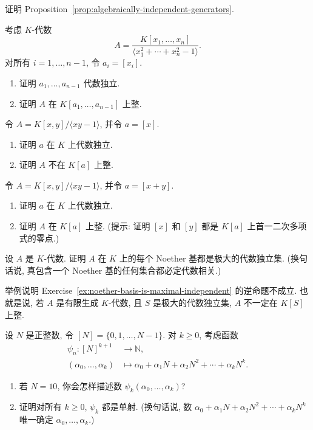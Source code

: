 \BookExerciseHeading
\begin{BookExercises}
  \item\label{ex:prove-independent-generators-proposition} 证明 Proposition~\ref{prop:algebraically-independent-generators}.
  \item\label{ex:noether-basis-for-unit-sphere} 考虑 $K$-代数
  \[
    A=\frac{K[x_{1},\ldots,x_{n}]}{\langle x_{1}^{2}+\cdots+x_{n}^{2}-1\rangle}.
  \]
  对所有 $i=1,\ldots,n-1$, 令 $a_{i}=[x_{i}]$.
  \begin{enumerate}
    \item 证明 $a_{1},\ldots,a_{n-1}$ 代数独立.
    \item 证明 $A$ 在 $K[a_{1},\ldots,a_{n-1}]$ 上整.
  \end{enumerate}
  \item\label{ex:hyperbola-not-integral-over-x} 令 $A=K[x,y]/\langle xy-1\rangle$, 并令 $a=[x]$.
  \begin{enumerate}
    \item 证明 $a$ 在 $K$ 上代数独立.
    \item 证明 $A$ 不在 $K[a]$ 上整.
  \end{enumerate}
  \item\label{ex:hyperbola-integral-over-sum} 令 $A=K[x,y]/\langle xy-1\rangle$, 并令 $a=[x+y]$.
  \begin{enumerate}
    \item 证明 $a$ 在 $K$ 上代数独立.
    \item 证明 $A$ 在 $K[a]$ 上整. (提示: 证明 $[x]$ 和 $[y]$ 都是 $K[a]$ 上首一二次多项式的零点.)
  \end{enumerate}
  \item\label{ex:noether-basis-is-maximal-independent} 设 $A$ 是 $K$-代数. 证明 $A$ 在 $K$ 上的每个 Noether 基都是极大的代数独立集. (换句话说, 真包含一个 Noether 基的任何集合都必定代数相关.)
  \item\label{ex:maximal-independent-need-not-be-noether-basis} 举例说明 Exercise~\ref{ex:noether-basis-is-maximal-independent} 的逆命题不成立. 也就是说, 若 $A$ 是有限生成 $K$-代数, 且 $S$ 是极大的代数独立集, $A$ 不一定在 $K[S]$ 上整.
  \item\label{ex:uniqueness-of-base-n-expansions} 设 $N$ 是正整数, 令 $[N]=\{0,1,\ldots,N-1\}$. 对 $k\geq0$, 考虑函数
  \[
    \begin{aligned}
      \psi_{n}:[N]^{k+1} &\to \mathbb{N},\\
      (\alpha_{0},\ldots,\alpha_{k}) &\mapsto
        \alpha_{0}+\alpha_{1}N+\alpha_{2}N^{2}+\cdots+\alpha_{k}N^{k}.
    \end{aligned}
  \]
  \begin{enumerate}
    \item 若 $N=10$, 你会怎样描述数 $\psi_{k}(\alpha_{0},\ldots,\alpha_{k})$?
    \item 证明对所有 $k\geq0$, $\psi_{k}$ 都是单射. (换句话说, 数 $\alpha_{0}+\alpha_{1}N+\alpha_{2}N^{2}+\cdots+\alpha_{k}N^{k}$ 唯一确定 $\alpha_{0},\ldots,\alpha_{k}$.)
  \end{enumerate}
\end{BookExercises}
